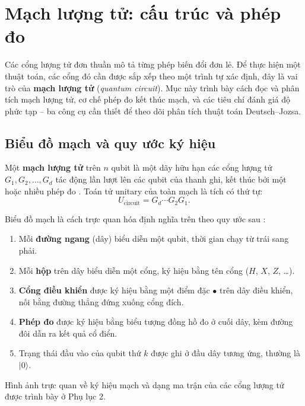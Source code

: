 \section{Mạch lượng tử: cấu trúc và phép đo}
\label{sec:circuit-measure}

Các cổng lượng tử đơn thuần mô tả từng phép biến đổi đơn lẻ. Để
thực hiện một thuật toán, các cổng đó cần được sắp xếp theo một trình tự xác định, đây là vai trò của \textbf{mạch lượng tử} (\textit{quantum circuit}). Mục này
trình bày cách đọc và phân tích mạch lượng tử, cơ chế phép đo kết thúc mạch, và
các tiêu chí đánh giá độ phức tạp -- ba công cụ cần thiết để theo dõi phân tích
thuật toán Deutsch--Jozsa.

\subsection*{Biểu đồ mạch và quy ước ký hiệu}

\begin{definition}
\label{def:circuit}
Một \textbf{mạch lượng tử} trên $n$ qubit là một dãy hữu hạn các cổng lượng tử
$G_1, G_2, \dots, G_d$ tác động lần lượt lên các qubit của thanh ghi, kết thúc
bởi một hoặc nhiều phép đo \cite{ref5}. Toán tử unitary của toàn mạch là tích
có thứ tự:
$$U_{\mathrm{circuit}} = G_d \cdots G_2 G_1.$$
\end{definition}

Biểu đồ mạch là cách trực quan hóa định nghĩa trên theo quy ước sau \cite{ref5}:

\begin{convention}
\label{conv:circuit}
\hfill
\begin{enumerate}[label=(\roman*)]
    \item Mỗi \textbf{đường ngang} (dây) biểu diễn một qubit, thời gian chạy
          từ trái sang phải.
    \item Mỗi \textbf{hộp} trên dây biểu diễn một cổng, ký hiệu bằng tên cổng
          ($H$, $X$, $Z$, \ldots).
    \item \textbf{Cổng điều khiển} được ký hiệu bằng một điểm đặc $\bullet$ trên
          dây điều khiển, nối bằng đường thẳng đứng xuống cổng đích.
    \item \textbf{Phép đo} được ký hiệu bằng biểu tượng đồng hồ đo ở
          cuối dây, kèm đường đôi dẫn ra kết quả cổ điển.
    \item Trạng thái đầu vào của qubit thứ $k$ được ghi ở đầu dây tương ứng,
          thường là $|0\rangle$.
\end{enumerate}
Hình ảnh trực quan về ký hiệu mạch và dạng ma trận của các cổng lượng tử được trình bày ở Phụ lục 2.
\end{convention}

